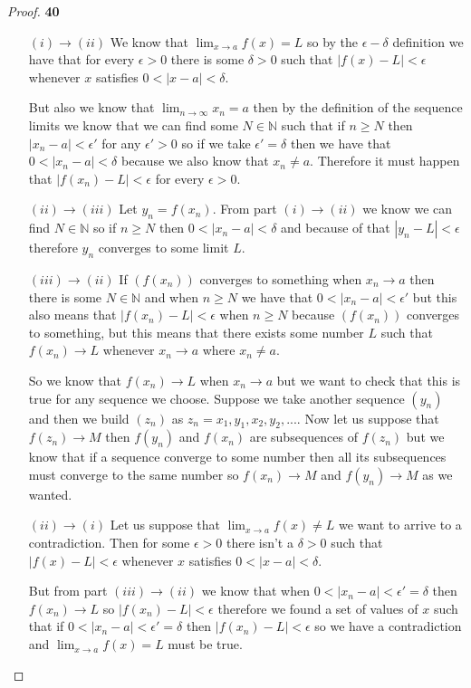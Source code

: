 \documentclass[11pt]{article}
\newcommand{\N}{\mathbb{N}}
\theoremstyle{definition}
\begin{document}
\cleardoublepage
    \begin{proof}{\textbf{40}}
    \begin{itemize}
        \item [$(i)\rightarrow(ii)$] We know that $\lim_{x \to a}f(x) = L$ so by the
        $\epsilon-\delta$ definition we have that for every $\epsilon>0$ there is some
        $\delta >0$ such that $|f(x)- L|<\epsilon$  whenever $x$ satisfies
        $0<|x-a|<\delta$.
        
        But also we know that $\lim_{n \to \infty} x_n = a$ then by the definition of
        the sequence limits we know that we can find some $N \in \N$ such that if $n\geq N$
        then $|x_n - a| < \epsilon'$ for any $\epsilon' > 0$ so if we take
        $\epsilon' = \delta$ then we have that $0<|x_n - a|<\delta$ because we also
        know that $x_n \neq a$. Therefore it must happen that $|f(x_n)-L|<\epsilon$
        for every $\epsilon >0$.

        \item [$(ii)\rightarrow(iii)$] 
        Let $y_n = f(x_n)$. From part $(i)\rightarrow(ii)$ we know we can find
        $N \in \N$ so if $n \geq N$ then $0<|x_n - a|<\delta$ and because of that 
        $|y_n - L|<\epsilon$ therefore $y_n$ converges to some limit $L$.

        \item [$(iii)\rightarrow(ii)$] If $(f(x_n))$ converges to something when
        $x_n\rightarrow a$ then there is some $N\in\N$ and when $n\geq N$ we have that
        $0<|x_n - a|<\epsilon'$    
        but this also means that $|f(x_n) - L|<\epsilon$ when
        $n\geq N$ because $(f(x_n))$ converges to something, but this means that there
        exists some number $L$ such that $f(x_n)\rightarrow L$ whenever
        $x_n \rightarrow a$ where $x_n \neq a$.
        
        So we know that $f(x_n)\rightarrow L$ when $x_n \rightarrow a$ but we want
        to check that this is true for any sequence we choose. Suppose we take another
        sequence $(y_n)$ and then we build $(z_n)$ as $z_n = x_1, y_1, x_2, y_2, ...$.
        Now let us suppose that $f(z_n) \rightarrow M$ then $f(y_n)$ and $f(x_n)$ are
        subsequences of $f(z_n)$ but we know that if a sequence converge to some number
        then all its subsequences must converge to the same number so
        $f(x_n) \rightarrow M$ and $f(y_n) \rightarrow M$ as we wanted.

        \item [$(ii)\rightarrow(i)$] Let us suppose that $\lim_{x \to a}f(x) \neq L$ we
        want to arrive to a contradiction. Then for some $\epsilon>0$ there isn't a 
        $\delta >0$ such that $|f(x)- L|<\epsilon$  whenever $x$ satisfies
        $0<|x-a|<\delta$.

        But from part $(iii)\rightarrow(ii)$ we know that when $0<|x_n-a|<\epsilon'=\delta$
        then $f(x_n) \rightarrow L$ so $|f(x_n)-L|<\epsilon$ therefore we found a set 
        of values of $x$ such that if $0<|x_n-a|<\epsilon'=\delta$
        then $|f(x_n)-L|<\epsilon$ so we have a contradiction and
        $\lim_{x \to a}f(x) = L$ must be true.
    \end{itemize}
    \end{proof}
\end{document}
